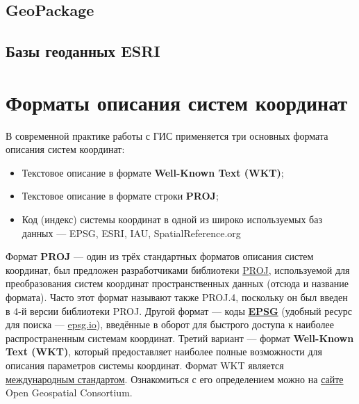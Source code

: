 \documentclass[
  12pt,
]{book}
\providecommand{\tightlist}{%
  \setlength{\itemsep}{0pt}\setlength{\parskip}{0pt}}
\begin{document}
\hypertarget{geopackage}{%
\section{GeoPackage}\label{geopackage}}

\hypertarget{ux431ux430ux437ux44b-ux433ux435ux43eux434ux430ux43dux43dux44bux445-esri}{%
\section{Базы геоданных ESRI}\label{ux431ux430ux437ux44b-ux433ux435ux43eux434ux430ux43dux43dux44bux445-esri}}

\hypertarget{manual-crs}{%
\chapter{Форматы описания систем координат}\label{manual-crs}}

В современной практике работы с ГИС применяется три основных формата описания систем координат:

\begin{itemize}
\tightlist
\item
  Текстовое описание в формате \textbf{Well-Known Text (WKT)};
\item
  Текстовое описание в формате строки \textbf{PROJ};
\item
  Код (индекс) системы координат в одной из широко используемых баз данных --- EPSG, ESRI, IAU, SpatialReference.org
\end{itemize}

Формат \textbf{PROJ} --- один из трёх стандартных форматов описания систем координат, был предложен разработчиками библиотеки \href{https://proj.org/}{PROJ}, используемой для преобразования систем координат пространственных данных (отсюда и название формата). Часто этот формат называют также PROJ.4, поскольку он был введен в 4-й версии библиотеки PROJ. Другой формат --- коды \href{http://www.epsg-registry.org/}{\textbf{EPSG}} (удобный ресурс для поиска --- \href{https://epsg.io/}{epsg.io}), введённые в оборот для быстрого доступа к наиболее распространенным системам координат. Третий вариант --- формат \textbf{Well-Known Text (WKT)}, который предоставляет наиболее полные возможности для описания параметров системы координат. Формат WKT является \href{https://www.iso.org/standard/76496.html}{международным стандартом}. Ознакомиться с его определением можно на \href{http://docs.opengeospatial.org/is/18-010r7/18-010r7.html}{сайте} Open Geospatial Consortium.
\end{document}
